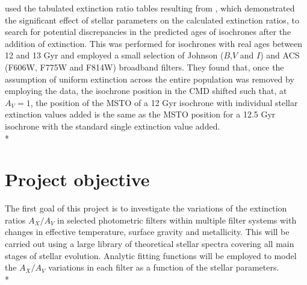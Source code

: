 \documentclass[12pt, a4paper]{report}
\begin{document}
\cite{2017Galax...5...28O} used the tabulated extinction ratio tables resulting from \cite{2008PASP..120..583G}, which demonstrated the significant effect of stellar parameters on the calculated extinction ratios, to search for potential discrepancies in the predicted ages of isochrones after the addition of extinction. This was performed for isochrones with real ages between 12 and 13 Gyr and employed a small selection of Johnson ($B$,$V$ and $I$) and ACS (F606W, F775W and F814W) broadband filters. They found that, once the assumption of uniform extinction across the entire population was removed by employing the \cite{2008PASP..120..583G} data, the isochrone position in the CMD shifted such that, at $A_{V} = 1$, the position of the MSTO of a 12 Gyr isochrone with individual stellar extinction values added is the same as the MSTO position for a 12.5 Gyr isochrone with the standard single extinction value added.\\*

\section{Project objective}
The first goal of this project is to investigate the variations of the extinction ratios $A_{X}/A_{V}$ in selected photometric filters within multiple filter systems with changes in effective temperature, surface gravity and metallicity. This will be carried out using a large library of theoretical stellar spectra covering all main stages of stellar evolution. Analytic fitting functions will be employed to model the $A_{X}/A_{V}$ variations in each filter as a function of the stellar parameters. \\*


\end{document}
